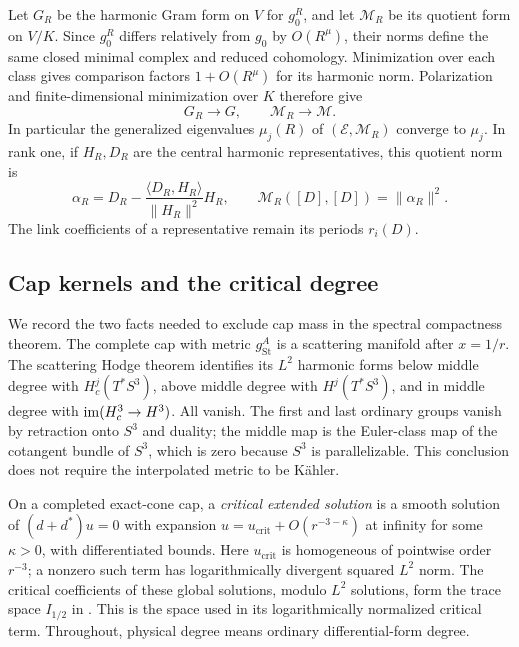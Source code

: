 Let $G_R$ be the harmonic Gram form on $V$ for $g_0^R$, and let
$\mathcal M_R$ be its quotient form on $V/K$. Since $g_0^R$ differs relatively
from $g_0$ by $O(R^\mu)$, their norms define the same closed minimal
complex and reduced cohomology. Minimization over each class gives
comparison factors $1+O(R^\mu)$ for its harmonic norm. Polarization and
finite-dimensional minimization over $K$ therefore give
\begin{equation}\label{eq:mass-limit}
 G_R\longrightarrow G,\qquad \mathcal M_R\longrightarrow\mathcal M.
\end{equation}
In particular the generalized eigenvalues $\mu_j(R)$ of $(\mathcal E,\mathcal M_R)$
converge to $\mu_j$. In rank one, if $H_R,D_R$ are the central harmonic
representatives, this quotient norm is
\begin{equation}\label{eq:model-mass}
 \alpha_R=D_R-\frac{\langle D_R,H_R\rangle}{\|H_R\|^2}H_R,
 \qquad \mathcal M_R([D],[D])=\|\alpha_R\|^2.
\end{equation}
The link coefficients of a representative remain its periods $r_i(D)$.

\subsection{Cap kernels and the critical degree}
We record the two facts needed to exclude cap mass in the spectral
compactness theorem. The complete cap with metric $g_{\mathrm{St}}^A$
is a scattering manifold after $x=1/r$. The scattering Hodge theorem
\cite[Theorem~1A]{hhm} identifies its $L^2$ harmonic forms below middle
degree with $H_c^j(T^*S^3)$, above middle degree with $H^j(T^*S^3)$,
and in middle degree with $\operatorname{im}(H_c^3\to H^3)$. All vanish. The first
and last ordinary groups vanish by retraction onto $S^3$ and duality;
the middle map is the Euler-class map of the cotangent bundle of $S^3$,
which is zero because $S^3$ is parallelizable. This conclusion does not
require the interpolated metric to be K\"ahler.

On a completed exact-cone cap, a \emph{critical extended solution} is a
smooth solution of $(d+d^*)u=0$ with expansion
$u=u_{\mathrm{crit}}+O(r^{-3-\kappa})$ at infinity for some $\kappa>0$,
with differentiated bounds. Here $u_{\mathrm{crit}}$ is homogeneous of
pointwise order $r^{-3}$; a nonzero such term has logarithmically divergent
squared $L^2$ norm. The critical coefficients of these global solutions,
modulo $L^2$ solutions, form the trace space $I_{1/2}$ in
\cite[equation~(8)]{anne-takahashi}. This is the space used in its
logarithmically normalized critical term. Throughout, physical degree
means ordinary differential-form degree.

